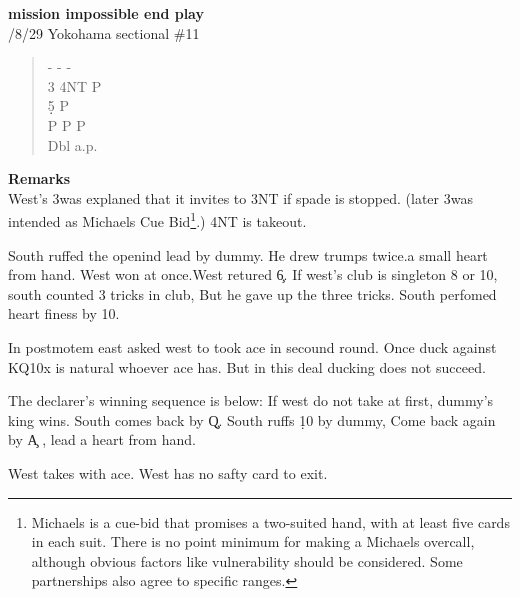 \vspace{0.5cm}
{\bf mission impossible end play}\\

/8/29 Yokohama sectional   \#11
\begin{quote}
%
  {}%
  {}%
  {}%
  {}%
\end{quote}
\begin{quote}
\begin{bidding}
- \> -  \> - \s \\
3\s  {}\s \> 4NT  \> P \\
5\d  {}\s  {}\d \> P \\
P \s \> P  \> P \\
Dbl \> a.p.
\end{bidding}
\end{quote}
{\bf Remarks}\\



West's 3\s  was explaned that it invites to 3NT if spade is stopped.
(later 3\s was intended as Michaels Cue Bid\footnote{
Michaels is a cue-bid that promises a two-suited hand, with at least five cards in each suit. There is no point minimum for making a Michaels overcall, although obvious factors like vulnerability should be considered. Some partnerships also agree to specific ranges.
}.)
4NT is takeout.


South ruffed the openind lead by dummy.
He drew trumps twice.a small heart from hand.  West won at once.West retured 
\c 6. If west's club is singleton 8 or 10, south counted 3 tricks in club,
But he gave up the three tricks. South perfomed heart finess by 10.

In postmotem east asked west to took ace in secound round.
Once duck against KQ10x is natural whoever ace has. But in this deal
ducking does not succeed.



The declarer's winning sequence is below:
If west do not take at first, dummy's king wins. South comes back by \c Q.
South ruffs \d 10 by dummy, Come back again by \c A ,  lead a 
heart from hand. 


West takes with ace. West has no safty card to exit.


